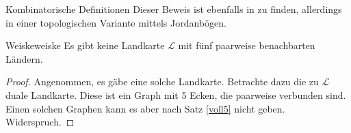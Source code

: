\begin{section}{Kombinatorische Definitionen}
  Dieser Beweis ist ebenfalls in \cite[Satz 4.1.2]{fritsch} zu finden, allerdings in einer topologischen Variante mittels Jordanbögen. 
  
 \begin{satzl}{Weiske}{weiske}
  Es gibt keine Landkarte $\mathcal{L}$ mit fünf paarweise benachbarten Ländern.
 \end{satzl}
 \begin{proof}
  Angenommen, es gäbe eine solche Landkarte. Betrachte dazu die zu $\mathcal{L}$ duale Landkarte. Diese ist ein Graph mit 5 Ecken, die paarweise verbunden sind. Einen solchen Graphen kann es aber nach Satz \ref{voll5} nicht geben. Widerspruch.
 \end{proof}
\end{section}